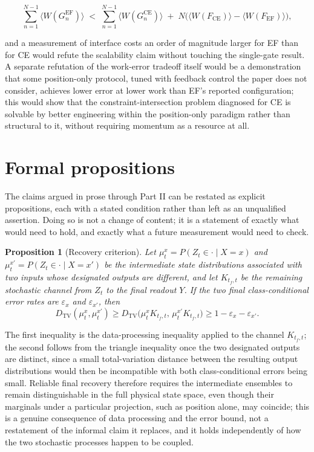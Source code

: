 \documentclass[11pt]{article}
\newtheorem{proposition}{Proposition}
\begin{document}
\[
\sum_{n=1}^{N-1}\langle W(G_n^{\mathrm{EF}})\rangle \;<\; \sum_{n=1}^{N-1}\langle W(G_n^{\mathrm{CE}})\rangle \;+\; N\bigl(\langle W(F_{\mathrm{CE}})\rangle - \langle W(F_{\mathrm{EF}})\rangle\bigr),
\]

and a measurement of interface costs an order of magnitude larger for EF than for CE would refute the scalability claim without touching the single-gate result. A separate refutation of the work-error tradeoff itself would be a demonstration that some position-only protocol, tuned with feedback control the paper does not consider, achieves lower error at lower work than EF's reported configuration; this would show that the constraint-intersection problem diagnosed for CE is solvable by better engineering within the position-only paradigm rather than structural to it, without requiring momentum as a resource at all.

\section{Formal propositions}

The claims argued in prose through Part II can be restated as explicit propositions, each with a stated condition rather than left as an unqualified assertion. Doing so is not a change of content; it is a statement of exactly what would need to hold, and exactly what a future measurement would need to check.

\begin{proposition}[Recovery criterion]
Let $\mu_t^x=P(Z_t\in\cdot\mid X=x)$ and $\mu_t^{x'}=P(Z_t\in\cdot\mid X=x')$ be the intermediate state distributions associated with two inputs whose designated outputs are different, and let $K_{t_f,t}$ be the remaining stochastic channel from $Z_t$ to the final readout $Y$. If the two final class-conditional error rates are $\varepsilon_x$ and $\varepsilon_{x'}$, then
\[
D_{\mathrm{TV}}(\mu_t^x,\mu_t^{x'}) \ge D_{\mathrm{TV}}\bigl(\mu_t^xK_{t_f,t},\,\mu_t^{x'}K_{t_f,t}\bigr) \ge 1-\varepsilon_x-\varepsilon_{x'}.
\]
\end{proposition}

The first inequality is the data-processing inequality applied to the channel $K_{t_f,t}$; the second follows from the triangle inequality once the two designated outputs are distinct, since a small total-variation distance between the resulting output distributions would then be incompatible with both class-conditional errors being small. Reliable final recovery therefore requires the intermediate ensembles to remain distinguishable in the full physical state space, even though their marginals under a particular projection, such as position alone, may coincide; this is a genuine consequence of data processing and the error bound, not a restatement of the informal claim it replaces, and it holds independently of how the two stochastic processes happen to be coupled.
\end{document}
